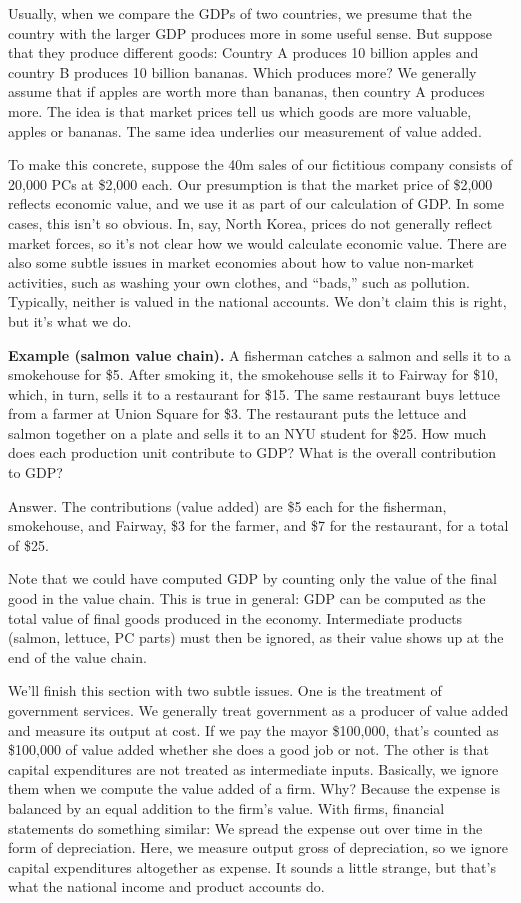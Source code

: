 Usually, when we compare the GDPs of two countries, we presume
that the country with the larger GDP produces more in some
useful sense. But suppose that they produce different goods:
Country A produces 10 billion apples and country B produces 10
billion bananas.  Which produces more? We generally assume that if
apples are worth more than bananas, then country A produces more.
The idea is that market prices tell us which goods are more valuable,
apples or bananas. The same idea underlies our measurement of
value added.

To make this concrete, suppose the 40m sales of
our fictitious company consists of 20,000 PCs at \$2,000 each. Our
presumption is that the market price of \$2,000 reflects economic
value, and we use it as part of our calculation of GDP. In some
cases, this isn't so obvious. In, say, North Korea, prices do not
generally reflect market forces, so it's not clear how we would calculate
economic value.
There are also some subtle issues in market economies
about how to value non-market activities, such as
washing your own clothes, and ``bads,'' such as pollution.
Typically, neither is valued in the national accounts.
We don't claim this is right, but it's what we do.

\textbf{Example (salmon value chain).} A fisherman catches a salmon
and sells it to a smokehouse for \$5. After smoking it, the
smokehouse sells it to Fairway for \$10, which, in turn,
sells it to a restaurant for \$15. The same restaurant buys
lettuce from a farmer at Union Square for \$3. The restaurant puts
the lettuce and salmon together on a plate and sells it to an NYU
student for \$25. How much does each production unit contribute to
GDP? What is the overall contribution to GDP?

Answer. The contributions (value added) are \$5 each for the
fisherman, smokehouse, and Fairway, \$3 for the farmer, and
\$7 for the restaurant, for a total of \$25.

Note that we could
have computed GDP by counting only the value of the final good
in the value chain. This is true in general: GDP can be
computed as the total value of final goods produced in the
economy. Intermediate products (salmon, lettuce, PC parts) must
then be ignored, as their value shows up at the end of the value
chain.

We'll finish this section with two subtle issues.
One is the treatment of government services.
We generally treat government as a producer of value added
and measure its output at cost.
If we pay the mayor \$100,000, that's counted as \$100,000
of value added whether she does a good job or not.
The other is that capital expenditures are not treated as
intermediate inputs.
Basically, we ignore them when we compute the value added of a firm.
Why? Because the expense is balanced
by an equal addition to the firm's value.
With firms, financial statements do something similar:
We spread the expense out over time in the form of depreciation.
Here, we measure output gross of depreciation, so we ignore
capital expenditures altogether as expense.
It sounds a little strange, but that's what the national income
and product accounts do.


